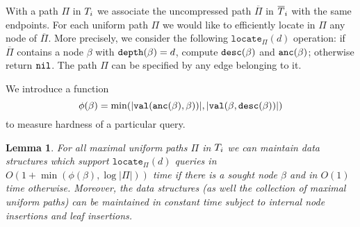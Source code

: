 \documentclass[a4paper]{article}
\newtheorem{lemma}[theorem]{Lemma}
\theoremstyle{remark}
\begin{document}
\newcommand{\tlocate}{\mathtt{locate}}
With a path $\Pi$ in $T_i$ we associate the uncompressed path $\overline{\Pi}$ in $\overline{T}_i$
with the same endpoints.
For each uniform path $\Pi$ we would like to efficiently locate in $\Pi$ any node of $\overline{\Pi}$.
More precisely, we consider the following $\tlocate_{\Pi}(d)$ operation: if $\overline{\Pi}$ contains
a node $\beta$ with $\mathtt{depth}(\beta)=d$, compute $\mathtt{desc}(\beta)$ and $\mathtt{anc}(\beta)$; otherwise return $\mathtt{nil}$.
The path $\Pi$ can be specified by any edge belonging to it.

We introduce a function $$\phi(\beta)=\min(|\mathtt{val}(\mathtt{anc}(\beta),\beta))|,|\mathtt{val}(\beta,\mathtt{desc}(\beta))|)$$
to measure hardness of a particular query.

\begin{lemma}\label{lem:st}
For all maximal uniform paths $\Pi$ in $T_i$ we can maintain data structures which support
$\tlocate_{\Pi}(d)$ queries in $O(1+\min(\phi(\beta),\log |\Pi|))$ time if there is a sought node $\beta$
and in $O(1)$ time otherwise.
Moreover, the data structures (as well the collection of maximal uniform paths) can be maintained
in constant time subject to internal node insertions and leaf insertions.
\end{lemma}
\end{document}
